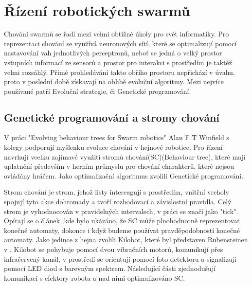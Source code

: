 \section{Řízení robotických swarmů}
Chování swarmů se řadí mezi velmi obtížné úkoly pro svět informatiky. Pro reprezentaci chování se využívá neuronových sítí, které se optimalizují pomocí nastavování vah jednotlivých perceptronů, neboť se jedná o velký prostor vstupních informací ze sensorů a prostor pro interakci s prostředím je taktéž velmi rozsáhlý. Přímé prohledávání takto obřího prostoru nepřichází v úvahu, proto v poslední době získavají na oblibě evoluční algoritmy. Mezi nejvíce používané patří Evoluční strategie, či Genetické programování. \par 

\subsection{Genetické programování a stromy chování}
V práci "Evolving behaviour trees for Swarm robotics" \cite{jonesevolving} Alan F T Winfield s kolegy podporují myšlenku evoluce chování v hejnové robotice. Pro řízení navrhují vcelku zajímavé využití stromů chování(SC)(Behaviour tree), které mají uplatnění především v herním průmyslu pro chování charakterů, které nejsou ovládány hráčem. Jako optimalizační algoritmus zvolili Genetické programování. 
\par
Strom chování je strom, jehož listy intereagují s prostředím, vnitřní vrcholy spojují tyto akce dohromady a tvoří rozhodovací a závislostní pravidla. Celý strom je vyhodnocován v pravidelných intervalech, v práci se značí jako "tick". Opírají se o článek \cite{shoulson2011parameterizing},kde bylo ukázáno, že SC může plnohodnotně reprezentovat konečné automaty, dokonce i když budeme používat pravděpodobností konečné automaty. Jako jedince z hejna zvolili Kilobot, které byl představen Rubensteinen v \cite{Kilobots}. Kilobot se pohybuje pomocí dvou vibračních motorů, komunikují přes infračervený kanál, v prostředí se orientují pomocí foto detektoru a signalizují pomocí LED diod s barevným spektrem. Následující části zjednodušují komunikaci s efektory robota a nad nimi optimalizováno SC. 
\par
